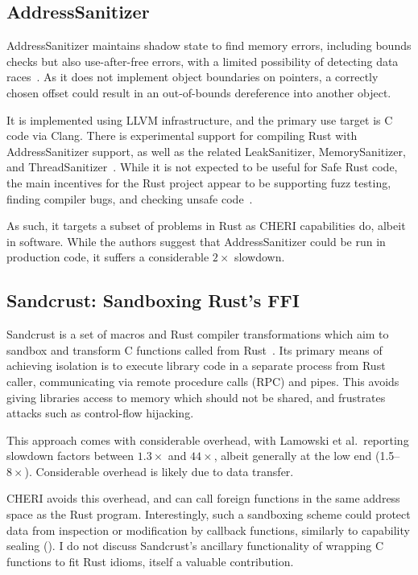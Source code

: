 \documentclass[dissertation.tex]{subfiles}
\begin{document}
\subsection{AddressSanitizer}
\label{sec:rel-asan}

AddressSanitizer maintains shadow state to find memory errors, including
bounds checks but also use-after-free errors, with a limited possibility
of detecting data races~\cite{serebryany-asan}.
As it does not implement object boundaries on pointers, a correctly
chosen offset could result in an out-of-bounds dereference into another
object.

It is implemented using LLVM infrastructure, and the primary use target
is C code via Clang.
There is experimental support for compiling Rust with AddressSanitizer
support, as well as the related LeakSanitizer, MemorySanitizer, and
ThreadSanitizer~\cite{rust-san}.
While it is not expected to be useful for Safe Rust code, the main
incentives for the Rust project appear to be supporting fuzz testing,
finding compiler bugs, and checking unsafe code~\cite{rust-asan-track}.

As such, it targets a subset of problems in Rust as CHERI capabilities
do, albeit in software.
While the authors suggest that AddressSanitizer could be run in
production code, it suffers a considerable \(2\times\) slowdown.


\subsection{Sandcrust: Sandboxing Rust's FFI}
\label{sec:rel-sandcrust}

Sandcrust is a set of macros and Rust compiler transformations which aim
to sandbox and transform C functions called from
Rust~\cite{lamowski-sandcrust}.
Its primary means of achieving isolation is to execute library code in a
separate process from Rust caller, communicating via remote procedure
calls (RPC) and pipes.
This avoids giving libraries access to memory which should not be
shared, and frustrates attacks such as control-flow hijacking.

This approach comes with considerable overhead, with Lamowski et al.\
reporting slowdown factors between \(1.3\times\) and \(44\times\),
albeit generally at the low end (1.5--\(8\times\)).
Considerable overhead is likely due to data transfer.

CHERI avoids this overhead, and can call foreign functions in the same
address space as the Rust program.
Interestingly, such a sandboxing scheme could protect data from
inspection or modification by callback functions, similarly to
capability sealing ().
I do not discuss Sandcrust's ancillary functionality of wrapping C
functions to fit Rust idioms, itself a valuable contribution.
\end{document}

